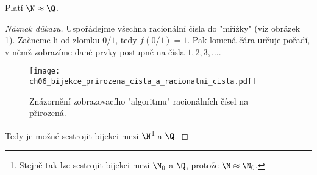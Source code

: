 \begin{theorem}\label{thm:N_a_Q}
    Platí $\N\approx\Q$.
\end{theorem}
\begin{proof}[Náznak důkazu]
    Uspořádejme všechna racionální čísla do "mřížky" (viz obrázek \ref{fig:bijekce_prirozena_cisla_a_racionalni_cisla}). Začneme-li od zlomku $0/1$, tedy $f(0/1)=1$. Pak lomená čára určuje pořadí, v němž zobrazíme dané prvky postupně na čísla $1,2,3,\dots$.
    \begin{figure}[H]
        \centering
        \texttt{[image: ch06\_bijekce\_prirozena\_cisla\_a\_racionalni\_cisla.pdf]}
        \caption{Znázornění zobrazovacího "algoritmu" racionálních čísel na přirozená.}
        \label{fig:bijekce_prirozena_cisla_a_racionalni_cisla}
    \end{figure}
    Tedy je možné sestrojit bijekci mezi $\N$\footnote{Stejně tak lze sestrojit bijekci mezi $\N_0$ a $\Q$, protože $\N\approx\N_0$.} a $\Q$.
\end{proof}
\medskip

